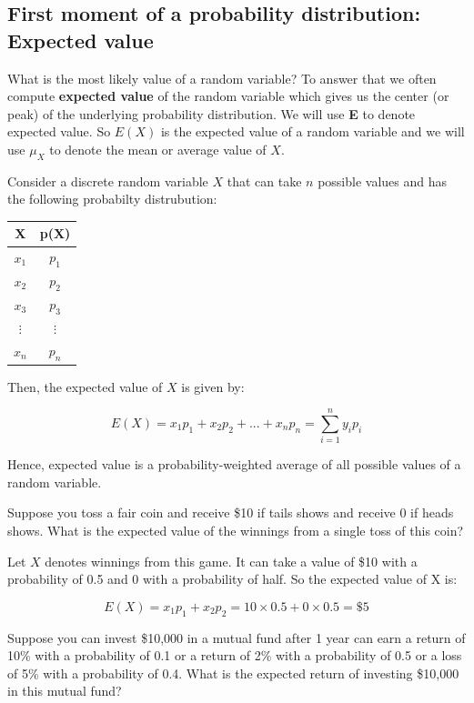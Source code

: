 \documentclass[]{book}
\theoremstyle{definition}
\theoremstyle{definition}
\theoremstyle{definition}
\theoremstyle{remark}
\let\BeginKnitrBlock\begin \let\EndKnitrBlock\end
\begin{document}
\hypertarget{first-moment-of-a-probability-distribution-expected-value}{%
\subsection{First moment of a probability distribution: Expected value}\label{first-moment-of-a-probability-distribution-expected-value}}

What is the most likely value of a random variable? To answer that we often compute \textbf{expected value} of the random variable which gives us the center (or peak) of the underlying probability distribution. We will use \textbf{E} to denote expected value. So \(E(X)\) is the expected value of a random variable and we will use \(\mu_X\) to denote the mean or average value of \(X\).

\BeginKnitrBlock{definition}[Expected Value]
\protect\hypertarget{def:unnamed-chunk-43}{}{\label{def:unnamed-chunk-43} {} }Consider a discrete random variable \(X\) that can take \(n\) possible values and has the following probabilty distrubution:

\begin{longtable}[]{@{}cc@{}}
\toprule
X & p(X)\tabularnewline
\midrule
\endhead
\(x_1\) & \(p_1\)\tabularnewline
\(x_2\) & \(p_2\)\tabularnewline
\(x_3\) & \(p_3\)\tabularnewline
\(\vdots\) & \(\vdots\)\tabularnewline
\(x_n\) & \(p_n\)\tabularnewline
\bottomrule
\end{longtable}

Then, the expected value of \(X\) is given by:

\[E(X)= x_1 p_1 + x_2 p_2+...+ x_n p_n = \sum_{i=1}^n y_ip_i\]
\EndKnitrBlock{definition}

Hence, expected value is a probability-weighted average of all possible values of a random variable.
\BeginKnitrBlock{example}
\protect\hypertarget{exm:unnamed-chunk-44}{}{\label{exm:unnamed-chunk-44} }Suppose you toss a fair coin and receive \$10 if tails shows and receive 0 if heads shows. What is the expected value of the winnings from a single toss of this coin?
\EndKnitrBlock{example}

\BeginKnitrBlock{solution}
{}Let \(X\) denotes winnings from this game. It can take a value of \$10 with a probability of 0.5 and 0 with a probability of half. So the expected value of X is:

\[E(X) = x_1 p_1+x_2 p_2=10\times 0.5 + 0\times 0.5=\$5\]
\EndKnitrBlock{solution}

\BeginKnitrBlock{example}
\protect\hypertarget{exm:unnamed-chunk-46}{}{\label{exm:unnamed-chunk-46} }Suppose you can invest \$10,000 in a mutual fund after 1 year can earn a return of 10\%
with a probability of 0.1 or a return of 2\% with a probability of 0.5 or a loss of 5\% with a probability of 0.4. What is the expected return of investing \$10,000 in this mutual fund?
\EndKnitrBlock{example}
\end{document}
